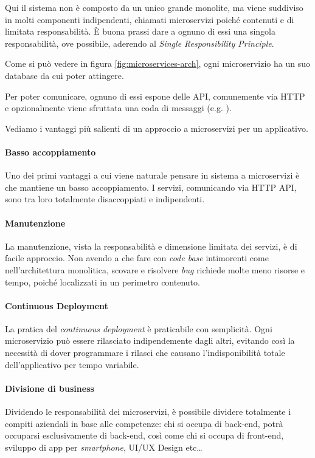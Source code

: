 Qui il sistema non è composto da un unico grande monolite, ma viene suddiviso in molti componenti indipendenti, chiamati microservizi poiché contenuti e di limitata responsabilità.
È buona prassi dare a ognuno di essi una singola responsabilità, ove possibile, aderendo al \textit{Single Responsibility Principle}.

Come si può vedere in figura \ref{fig:microservices-arch}, ogni microservizio ha un suo database da cui poter attingere.

Per poter comunicare, ognuno di essi espone delle API, comunemente via HTTP e opzionalmente viene sfruttata una coda di messaggi (e.g. ).

\medskip

Vediamo i vantaggi più salienti di un approccio a microservizi per un applicativo.

\paragraph*{Basso accoppiamento} Uno dei primi vantaggi a cui viene naturale pensare in sistema a microservizi è che mantiene un basso accoppiamento. I servizi, comunicando via HTTP API, sono tra loro totalmente disaccoppiati e indipendenti.

\paragraph*{Manutenzione} La manutenzione, vista la responsabilità e dimensione limitata dei servizi, è di facile approccio.
Non avendo a che fare con \textit{code base} intimorenti come nell'architettura monolitica, scovare e risolvere \textit{bug} richiede
molte meno risorse e tempo, poiché localizzati in un perimetro contenuto.

\paragraph*{Continuous Deployment} La pratica del \textit{continuous deployment} è praticabile con semplicità.
Ogni microservizio può essere rilasciato indipendemente dagli altri,
evitando così la necessità di dover programmare i rilasci che causano l'indisponibilità totale
dell'applicativo per tempo variabile.

\paragraph*{Divisione di business} Dividendo le responsabilità dei microservizi, è possibile dividere totalmente i compiti aziendali in base alle
competenze: chi si occupa di back-end, potrà occuparsi esclusivamente di
back-end, così come chi si occupa di front-end, sviluppo di app per \textit{smartphone}, UI/UX Design etc\dots

